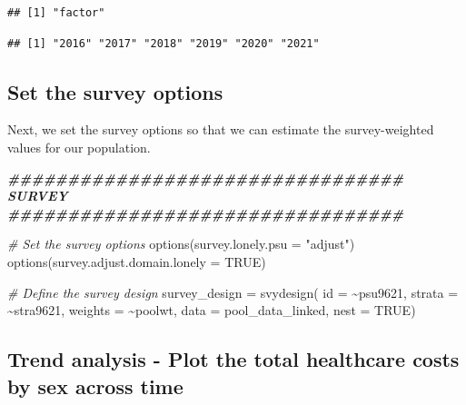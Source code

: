 \documentclass[
]{book}
\newenvironment{Shaded}{\begin{snugshade}}{\end{snugshade}}
\newcommand{\AttributeTok}[1]{\textcolor[rgb]{0.77,0.63,0.00}{#1}}
\newcommand{\CommentTok}[1]{\textcolor[rgb]{0.56,0.35,0.01}{\textit{#1}}}
\newcommand{\ConstantTok}[1]{\textcolor[rgb]{0.00,0.00,0.00}{#1}}
\newcommand{\DocumentationTok}[1]{\textcolor[rgb]{0.56,0.35,0.01}{\textbf{\textit{#1}}}}
\newcommand{\FunctionTok}[1]{\textcolor[rgb]{0.00,0.00,0.00}{#1}}
\newcommand{\NormalTok}[1]{#1}
\newcommand{\OtherTok}[1]{\textcolor[rgb]{0.56,0.35,0.01}{#1}}
\newcommand{\SpecialCharTok}[1]{\textcolor[rgb]{0.00,0.00,0.00}{#1}}
\newcommand{\StringTok}[1]{\textcolor[rgb]{0.31,0.60,0.02}{#1}}
\begin{document}
\begin{verbatim}
## [1] "factor"
\end{verbatim}

\begin{Shaded}
\end{Shaded}

\begin{verbatim}
## [1] "2016" "2017" "2018" "2019" "2020" "2021"
\end{verbatim}

\hypertarget{set-the-survey-options}{%
\subsection{Set the survey options}\label{set-the-survey-options}}

Next, we set the survey options so that we can estimate the survey-weighted values for our population.

\begin{Shaded}
\begin{Highlighting}[]
\DocumentationTok{\#\#\#\#\#\#\#\#\#\#\#\#\#\#\#\#\#\#\#\#\#\#\#\#\#\#\#\#\#\#\#\#\# SURVEY \#\#\#\#\#\#\#\#\#\#\#\#\#\#\#\#\#\#\#\#\#\#\#\#\#\#\#\#\#\#\#\#\# }

\CommentTok{\# Set the survey options}
\FunctionTok{options}\NormalTok{(}\AttributeTok{survey.lonely.psu =} \StringTok{"adjust"}\NormalTok{)}
\FunctionTok{options}\NormalTok{(}\AttributeTok{survey.adjust.domain.lonely =} \ConstantTok{TRUE}\NormalTok{)}


\CommentTok{\# Define the survey design}
\NormalTok{survey\_design }\OtherTok{=} \FunctionTok{svydesign}\NormalTok{(}
  \AttributeTok{id =} \SpecialCharTok{\textasciitilde{}}\NormalTok{psu9621,}
  \AttributeTok{strata =} \SpecialCharTok{\textasciitilde{}}\NormalTok{stra9621,}
  \AttributeTok{weights =} \SpecialCharTok{\textasciitilde{}}\NormalTok{poolwt,}
  \AttributeTok{data =}\NormalTok{ pool\_data\_linked,}
  \AttributeTok{nest =} \ConstantTok{TRUE}\NormalTok{)}
\end{Highlighting}
\end{Shaded}

\hypertarget{trend-analysis---plot-the-total-healthcare-costs-by-sex-across-time}{%
\subsection{Trend analysis - Plot the total healthcare costs by sex across time}\label{trend-analysis---plot-the-total-healthcare-costs-by-sex-across-time}}
\end{document}
